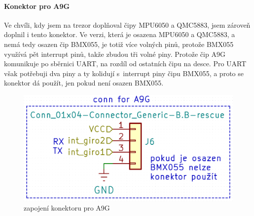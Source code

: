 \newpage

\paragraph{Konektor pro A9G} %
Ve chvíli, kdy jsem na trezor doplňoval čipy MPU6050 a QMC5883, jsem zároveň doplnil i tento konektor. Ve verzi, která je osazena MPU6050 a QMC5883, a nemá tedy osazen čip BMX055, je totiž více
volných pinů, protože BMX055 využívá pět interrupt pinů, takže zbudou tři volné piny. Protože čip A9G komunikuje po sběrnici UART, na rozdíl od ostatních čipu na desce. Pro UART však potřebuji
dva piny a ty kolidují s~interrupt piny čipu BMX055, a proto se konektor dá použít, jen pokud není osazen BMX055.

\begin{figure}[htbp]
    \centering
    \includegraphics[width=\textwidth]{kapitoly/obrazky/E4/vnimani/conn-A9G.png}
    \caption{zapojení konektoru pro A9G}
    \label{fig:E4-A9G}
\end{figure}

\newpage